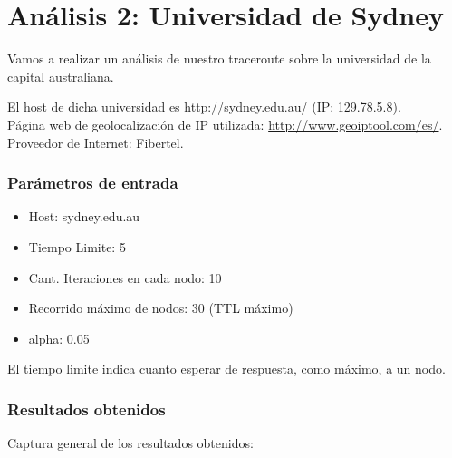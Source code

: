 \section{An\'alisis 2: Universidad de Sydney}
Vamos a realizar un an\'alisis de nuestro traceroute sobre la universidad de la capital australiana.\newline

El host de dicha universidad es http://sydney.edu.au/ (IP: 129.78.5.8).\\	

Página web de geolocalización de IP utilizada: \url{http://www.geoiptool.com/es/}.\\

Proveedor de Internet: Fibertel.

\subsubsection{Par\'ametros de entrada}
\begin{itemize}
\item Host: sydney.edu.au
\item Tiempo Limite: 5
\item Cant. Iteraciones en cada nodo: 10
\item Recorrido m\'aximo de nodos: 30 (TTL m\'aximo)
\item alpha: 0.05
\end{itemize}
El tiempo limite indica cuanto esperar de respuesta, como m\'aximo, a un nodo.\newline

\subsubsection{Resultados obtenidos}

Captura general de los resultados obtenidos: \newline



